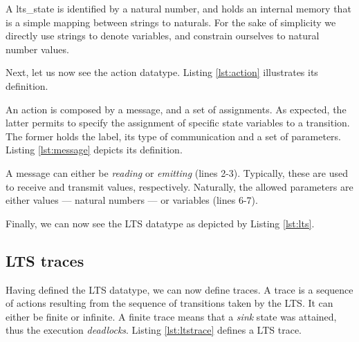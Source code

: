 	
	\noindent A \textsf{lts\_state} is identified by a natural number, and holds an internal memory that is a
	simple mapping between strings to naturals. For the sake of simplicity we directly use strings to denote variables,
	and constrain ourselves to natural number values.
	
	Next, let us now see the \textsf{action} datatype. Listing \ref{lst:action} illustrates its definition.
	
			

	\noindent An \textsf{action} is composed by a \textsf{message}, and a set of \textsf{assignments}.
	As expected, the latter permits to specify the assignment of specific state variables to a \textsf{transition}.
	The former holds the label, its type of communication and a set of parameters. Listing \ref{lst:message}
	depicts its definition.
	
				

	\noindent A message can either be \textit{reading} or \textit{emitting} (lines 2-3). Typically, these
	are used to receive and transmit values, respectively. Naturally, the allowed \textsf{parameters} are
	either values --- natural numbers --- or variables (lines 6-7).
	
	
	Finally, we can now see the \textsf{LTS} datatype as depicted by Listing \ref{lst:lts}.	
		
		


\subsection{LTS traces}
\label{sub:ltstrace}


	Having defined the \textsf{LTS} datatype, we can now define \textsf{traces}. A trace is a sequence of actions 
	resulting from the sequence of \textsf{transitions} taken by the \textsf{LTS}. It can either be finite or
	infinite. A finite trace means that a \textit{sink} state was attained, thus the execution \textit{deadlocks}.
	Listing \ref{lst:ltstrace} defines a \textsf{LTS} trace.	
	
